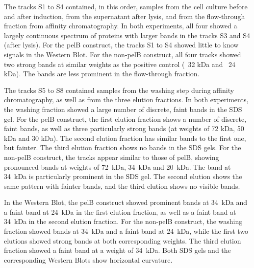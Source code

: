 \documentclass[a4paper,12pt]{article}
\begin{document}
The tracks S1 to S4 contained, in this order, samples from the cell culture before and after induction, from the supernatant after lysis, and from the flow-through fraction from affinity chromatography. In both experiments, all four showed a largely continuous spectrum of proteins with larger bands in the tracks S3 and S4 (after lysis). For the pelB construct, the tracks S1 to S4 showed little to know signals in the Western Blot. For the non-pelB construct, all four tracks showed two strong bands at similar weights as the positive control (~32 kDa and ~24 kDa). The bands are less prominent in the flow-through fraction.

The tracks S5 to S8 contained samples from the washing step during affinity chromatography, as well as from the three elution fractions. In both experiments, the washing fraction showed a large number of discrete, faint bands in the SDS gel. For the pelB construct, the first elution fraction shows a number of discrete, faint bands, as well as three particularly strong bands (at weights of 72 kDa, 50 kDa and 30 kDa). The second elution fraction has similar bands to the first one, but fainter. The third elution fraction shows no bands in the SDS gels. For the non-pelB construct, the tracks appear similar to those of pelB, showing pronounced bands at weights of 72~kDa, 34~kDa and 20~kDa. The band at 34~kDa is particularly prominent in the SDS gel. The second elution shows the same pattern with fainter bands, and the third elution shows no visible bands.

In the Western Blot, the pelB construct showed prominent bands at 34~kDa  and a faint band at 24~kDa in the first elution fraction, as well as a faint band at 34~kDa in the second elution fraction. For the non-pelB construct, the washing fraction showed bands at 34~kDa and a faint band at 24~kDa, while the first two elutions showed strong bands at both corresponding weights. The third elution fraction showed a faint band at a weight of 34~kDa. Both SDS gels and the corresponding Western Blots show horizontal curvature.
\end{document}
